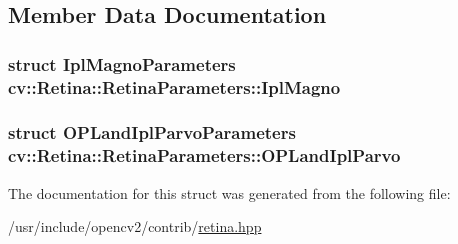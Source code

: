 \subsection{Member Data Documentation}
\hypertarget{structcv_1_1Retina_1_1RetinaParameters_a5de59166febecb714995e2c875e8126a}{
\subsubsection[{Ipl\-Magno}]{\setlength{\rightskip}{0pt plus 5cm}struct {\bf Ipl\-Magno\-Parameters} cv\-::\-Retina\-::\-Retina\-Parameters\-::\-Ipl\-Magno}}\label{structcv_1_1Retina_1_1RetinaParameters_a5de59166febecb714995e2c875e8126a}
\hypertarget{structcv_1_1Retina_1_1RetinaParameters_af15134145ec98046cb65cd2400d11342}{
\subsubsection[{O\-P\-Land\-Ipl\-Parvo}]{\setlength{\rightskip}{0pt plus 5cm}struct {\bf O\-P\-Land\-Ipl\-Parvo\-Parameters} cv\-::\-Retina\-::\-Retina\-Parameters\-::\-O\-P\-Land\-Ipl\-Parvo}}\label{structcv_1_1Retina_1_1RetinaParameters_af15134145ec98046cb65cd2400d11342}


The documentation for this struct was generated from the following file\-:\begin{DoxyCompactItemize}
\item 
/usr/include/opencv2/contrib/\hyperlink{retina_8hpp}{retina.\-hpp}\end{DoxyCompactItemize}
